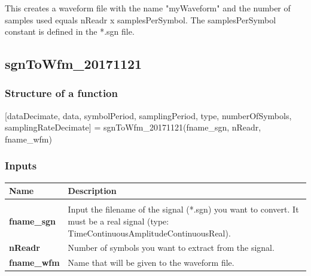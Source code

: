 \noindent
This creates a waveform file with the name "myWaveform" and the number of samples used equals nReadr x samplesPerSymbol. The samplesPerSymbol constant is defined in the *.sgn file.

\subsection{sgnToWfm\_20171121}

\subsubsection{Structure of a function}
[dataDecimate, data, symbolPeriod, samplingPeriod, type, numberOfSymbols, samplingRateDecimate]  = sgnToWfm\_20171121(fname\_sgn, nReadr, fname\_wfm)

\subsubsection*{Inputs}
\begin{tabular}{|p{2cm}||p{12cm}|}
	\hline
	\textbf{Name} &\textbf{Description}\\
	\hline
	\vspace{0.1cm}& \vspace{0.1cm}\\
	\textbf{fname\_sgn} \vspace{0.25cm}& Input the filename of the signal (*.sgn) you want to convert. It must be a real signal (type: TimeContinuousAmplitudeContinuousReal).\vspace{0.25cm}\\
	
	\textbf{nReadr} \vspace{0.25cm}& Number of symbols you want to extract from the signal.\vspace{0.25cm}\\
	
	\textbf{fname\_wfm}\vspace{0.25cm}& Name that will be given to the waveform file.\vspace{0.25cm}\\
	\hline
\end{tabular}

